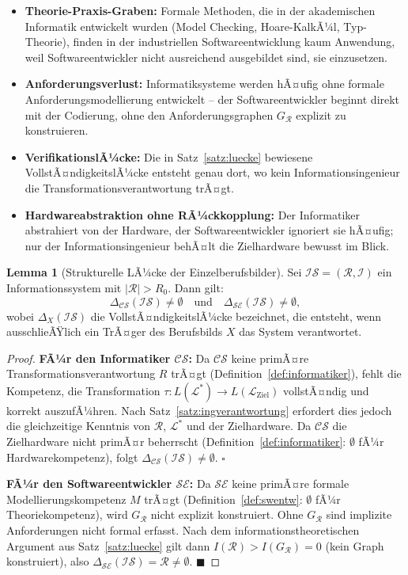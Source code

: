 ﻿\documentclass[a4paper,12pt]{report}
\theoremstyle{definition}
\newtheorem{lemma}{Lemma}[section]
\begin{document}
\begin{itemize}
  \item \textbf{Theorie-Praxis-Graben:} Formale Methoden, die in der akademischen
        Informatik entwickelt wurden (Model Checking, Hoare-KalkÃ¼l, Typ-Theorie),
        finden in der industriellen Softwareentwicklung kaum Anwendung,
        weil Softwareentwickler nicht ausreichend ausgebildet sind, sie einzusetzen.
  \item \textbf{Anforderungsverlust:} Informatiksysteme werden hÃ¤ufig ohne
        formale Anforderungsmodellierung entwickelt -- der Softwareentwickler
        beginnt direkt mit der Codierung, ohne den Anforderungsgraphen
        $G_\mathcal{R}$ explizit zu konstruieren.
  \item \textbf{VerifikationslÃ¼cke:} Die in Satz~\ref{satz:luecke} bewiesene
        VollstÃ¤ndigkeitslÃ¼cke entsteht genau dort, wo kein Informationsingenieur
        die Transformationsverantwortung trÃ¤gt.
  \item \textbf{Hardwareabstraktion ohne RÃ¼ckkopplung:} Der Informatiker abstrahiert
        von der Hardware, der Softwareentwickler ignoriert sie hÃ¤ufig; nur der
        Informationsingenieur behÃ¤lt die Zielhardware bewusst im Blick.
\end{itemize}

\begin{lemma}[Strukturelle LÃ¼cke der Einzelberufsbilder]
\label{lem:luecke_berufe}
Sei $\mathcal{IS} = (\mathcal{R}, \mathcal{I})$ ein Informationssystem mit
$|\mathcal{R}| > R_0$. Dann gilt:
\[
  \Delta_{\mathcal{CS}}(\mathcal{IS}) \neq \emptyset
  \quad \text{und} \quad
  \Delta_{\mathcal{SE}}(\mathcal{IS}) \neq \emptyset,
\]
wobei $\Delta_X(\mathcal{IS})$ die VollstÃ¤ndigkeitslÃ¼cke bezeichnet, die entsteht,
wenn ausschlieÃŸlich ein TrÃ¤ger des Berufsbilds $X$ das System verantwortet.
\end{lemma}

\begin{proof}
\textbf{FÃ¼r den Informatiker $\mathcal{CS}$:}
Da $\mathcal{CS}$ keine primÃ¤re Transformationsverantwortung $R$ trÃ¤gt
(Definition~\ref{def:informatiker}), fehlt die Kompetenz, die Transformation
$\tau: L(\mathcal{L}^*) \to L(\mathcal{L}_{\text{Ziel}})$ vollstÃ¤ndig und korrekt
auszufÃ¼hren. Nach Satz~\ref{satz:ingverantwortung} erfordert dies jedoch die
gleichzeitige Kenntnis von $\mathcal{R}$, $\mathcal{L}^*$ und der Zielhardware.
Da $\mathcal{CS}$ die Zielhardware nicht primÃ¤r beherrscht
(Definition~\ref{def:informatiker}: $\emptyset$ fÃ¼r Hardwarekompetenz), folgt
$\Delta_{\mathcal{CS}}(\mathcal{IS}) \neq \emptyset$. $\square$

\textbf{FÃ¼r den Softwareentwickler $\mathcal{SE}$:}
Da $\mathcal{SE}$ keine primÃ¤re formale Modellierungskompetenz $M$ trÃ¤gt
(Definition~\ref{def:swentw}: $\emptyset$ fÃ¼r Theoriekompetenz), wird
$G_\mathcal{R}$ nicht explizit konstruiert. Ohne $G_\mathcal{R}$ sind
implizite Anforderungen nicht formal erfasst. Nach dem informationstheoretischen
Argument aus Satz~\ref{satz:luecke} gilt dann
$I(\mathcal{R}) > I(G_\mathcal{R}) = 0$ (kein Graph konstruiert), also
$\Delta_{\mathcal{SE}}(\mathcal{IS}) = \mathcal{R} \neq \emptyset$. $\blacksquare$
\end{proof}
\end{document}
